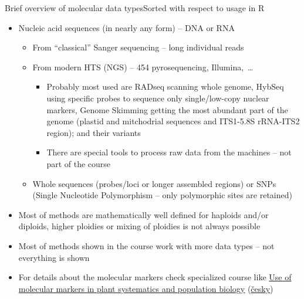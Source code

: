 \documentclass[compress, ucs, xelatex, 11pt, xcolor=svgnames,
  hyperref={
    bookmarks=true,
    unicode=true,
    colorlinks=true,
    pdftitle={Molecular data in R},
    plainpages=false,
    pdfauthor={Vojtech Zeisek},
    pdfsubject={Course about phylogeny and evolution in R},
    pdfcreator={XeLaTeX},
    pdfkeywords={R, evolution, phylogeny, molecular data},
    linkcolor=Tomato,
    anchorcolor=SaddleBrown,
    citecolor=Goldenrod,
    filecolor=DarkMagenta,
    menucolor=Sienna,
    urlcolor=DarkTurquoise,
    pdftex},
  url={hyphens, lowtilde} %
  ]{beamer}
\begin{document}
\begin{frame}[allowframebreaks]{Brief overview of molecular data types}{Sorted with respect to usage in R}
\begin{itemize}
\begin{itemize}
      \item R has plenty of packages for specialized protein analyses
    \end{itemize}
    \item Nucleic acid sequences (in nearly any form) -- DNA or RNA
    \begin{itemize}
      \item From ``classical'' Sanger sequencing -- long individual reads
      \item From modern HTS (NGS) -- 454 pyrosequencing, Illumina,~\ldots
	\begin{itemize}
	  \item Probably most used are RADseq scanning whole genome, HybSeq using specific probes to sequence only single/low-copy nuclear markers, Genome Skimming getting the most abundant part of the genome (plastid and mitchodrial sequences and ITS1-5.8S rRNA-ITS2 region); and their variants
	  \item There are special tools to process raw data from the machines -- not part of the course
	\end{itemize}
      \item Whole sequences (probes/loci or longer assembled regions) or SNPs (Single Nucleotide Polymorphism -- only polymorphic sites are retained)
    \end{itemize}
    \item Most of methods are mathematically well defined for haploids and/or diploids, higher ploidies or mixing of ploidies is not always possible
    \item Most of methods shown in the course work with more data types -- not everything is shown
    \item For details about the molecular markers check specialized course like \href{https://is.cuni.cz/studium/eng/predmety/index.php?do=predmet&kod=MB120P44}{Use of molecular markers in plant systematics and population biology} (\href{https://is.cuni.cz/studium/predmety/index.php?do=predmet&kod=MB120P44}{česky})
  \end{itemize}
\end{frame}
\end{document}
